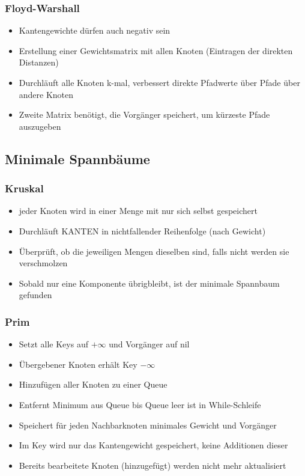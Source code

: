         \subsubsection{Floyd-Warshall}
            \begin{itemize}
                \item Kantengewichte dürfen auch negativ sein
                \item Erstellung einer Gewichtsmatrix mit allen Knoten (Eintragen der direkten Distanzen)
                \item Durchläuft alle Knoten k-mal, verbessert direkte Pfadwerte über Pfade über andere Knoten
                \item Zweite Matrix benötigt, die Vorgänger speichert, um kürzeste Pfade auszugeben
            \end{itemize}

    \subsection{Minimale Spannbäume}
        \subsubsection{Kruskal}
            \begin{itemize}
                \item jeder Knoten wird in einer Menge mit nur sich selbst gespeichert
                \item Durchläuft KANTEN in nichtfallender Reihenfolge (nach Gewicht)
                \item Überprüft, ob die jeweiligen Mengen dieselben sind, falls nicht werden sie verschmolzen
                \item Sobald nur eine Komponente übrigbleibt, ist der minimale Spannbaum gefunden
            \end{itemize}
        \subsubsection{Prim}
            \begin{itemize}
                \item Setzt alle Keys auf $+\infty$ und Vorgänger auf nil
                \item Übergebener Knoten erhält Key $-\infty$
                \item Hinzufügen aller Knoten zu einer Queue
                \item Entfernt Minimum aus Queue bis Queue leer ist in While-Schleife
                \item Speichert für jeden Nachbarknoten minimales Gewicht und Vorgänger
                \item Im Key wird nur das Kantengewicht gespeichert, keine Additionen dieser
                \item Bereits bearbeitete Knoten (hinzugefügt) werden nicht mehr aktualisiert
            \end{itemize}

